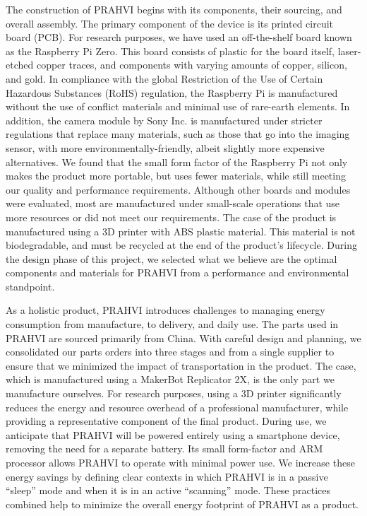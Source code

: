 	The construction of PRAHVI begins with its components, their sourcing, and overall assembly. The primary component of the device is its printed circuit board (PCB). For research purposes, we have used an off-the-shelf board known as the Raspberry Pi Zero. This board consists of plastic for the board itself, laser-etched copper traces, and components with varying amounts of copper, silicon, and gold. In compliance with the global Restriction of the Use of Certain Hazardous Substances (RoHS) regulation, the Raspberry Pi is manufactured without the use of conflict materials and minimal use of rare-earth elements. In addition, the camera module by Sony Inc. is manufactured under stricter regulations that replace many materials, such as those that go into the imaging sensor, with more environmentally-friendly, albeit slightly more expensive alternatives. We found that the small form factor of the Raspberry Pi not only makes the product more portable, but uses fewer materials, while still meeting our quality and performance requirements. Although other boards and modules were evaluated, most are manufactured under small-scale operations that use more resources or did not meet our requirements. The case of the product is manufactured using a 3D printer with ABS plastic material. This material is not biodegradable, and must be recycled at the end of the product's lifecycle. During the design phase of this project, we selected what we believe are the optimal components and materials for PRAHVI from a performance and environmental standpoint.
	
	As a holistic product, PRAHVI introduces challenges to managing energy consumption from manufacture, to delivery, and daily use. The parts used in PRAHVI are sourced primarily from China. With careful design and planning, we consolidated our parts orders into three stages and from a single supplier to ensure that we minimized the impact of transportation in the product. The case, which is manufactured using a MakerBot Replicator 2X, is the only part we manufacture ourselves. For research purposes, using a 3D printer significantly reduces the energy and resource overhead of a professional manufacturer, while providing a representative component of the final product. During use, we anticipate that PRAHVI will be powered entirely using a smartphone device, removing the need for a separate battery. Its small form-factor and ARM processor allows PRAHVI to operate with minimal power use. We increase these energy savings by defining clear contexts in which PRAHVI is in a passive “sleep” mode and when it is in an active “scanning” mode. These practices combined help to minimize the overall energy footprint of PRAHVI as a product.
	
